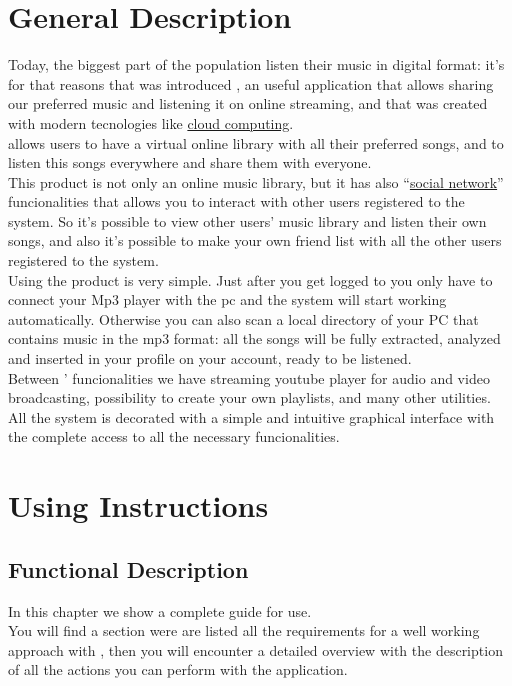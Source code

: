 \chapter{General Description}
\thispagestyle{fancy}
Today, the biggest part of the population listen their music in digital
format: it's for that reasons that was introduced , an useful
application that allows sharing our preferred music and listening it on online
streaming, and that was created with modern tecnologies like \underline{cloud
computing}.\\

 allows users to have a virtual online library with all their
preferred songs, and to listen this songs everywhere and share them with
everyone.\\

This product is not only an online music library, but it has also
``\underline{social network}'' funcionalities that allows you to interact with other users
registered to the system. So it's possible to view other users' music library
and listen their own songs, and also it's possible to make your own friend list
with all the other users registered to the system.\\

Using the product is very simple. Just after you get logged to  you
only have to connect your Mp3 player with the pc and the system will start
working automatically. Otherwise you can also scan a local directory of your PC
that contains music in the mp3 format: all the songs will be fully extracted,
analyzed and inserted in your profile on your  account, ready to be
listened.\\

Between ' funcionalities we have streaming youtube player for audio
and video broadcasting, possibility to create your own playlists, and many other
utilities.\\

All the system is decorated with a simple and intuitive graphical interface
with the complete access to all the necessary funcionalities.\\


\chapter{Using Instructions}
\thispagestyle{fancy}

\section{Functional Description}
In this chapter we show a complete guide for  use.\\
You will find a section were are listed all the requirements for a well
working approach with , then you will encounter a detailed overview
with the description of all the actions you can perform with the
application.

